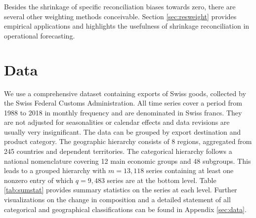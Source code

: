\documentclass[a4paper,fleqn,11pt]{article}
\begin{document}
Besides the shrinkage of specific reconciliation biases towards zero, there are several other weighting methods conceivable. Section \ref{sec:resweight} provides empirical applications and highlights the usefulness of shrinkage reconciliation in operational forecasting.



\section{Data}\label{sec:datadesc}

We use a comprehensive dataset containing exports of Swiss goods, collected by the Swiss Federal Customs Administration. All time series cover a period from 1988 to 2018 in monthly frequency and are denominated in Swiss francs. They are not adjusted for seasonalities or calendar effects and data revisions are usually very insignificant. The data can be grouped by export destination and product category. The geographic hierarchy consists of 8 regions, aggregated from 245 countries and dependent territories. The categorical hierarchy follows a national nomenclature covering 12 main economic groups and 48 subgroups. This leads to a grouped hierarchy with $m = 13,118$ series containing at least one nonzero entry of which $q = 9,483$ series are at the bottom level. Table \ref{tab:sumstat} provides summary statistics on the series at each level. Further visualizations on the change in composition and a detailed statement of all categorical and geographical classifications can be found in Appendix \ref{sec:data}.
\end{document}
